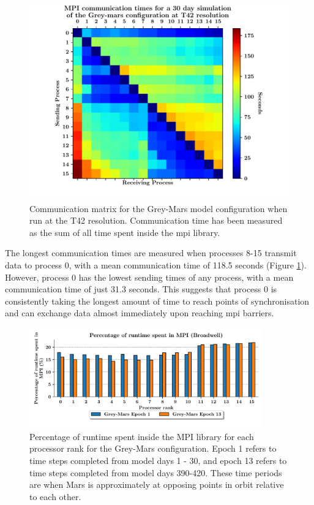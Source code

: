 \documentclass[a4paper,11pt]{report}
\begin{document}
\begin{figure}[htbp]
\begin{center}
\includegraphics[width=1\textwidth]{img/comm_mat_grey-mars.pdf}
\caption[Communication matrix for the Grey-Mars model configuration]{Communication matrix for the Grey-Mars model configuration when run at the T42 resolution. Communication time has been measured as the sum of all time spent inside the \gls{mpi} library.}
\label{fig:comm_mat}
\end{center}
\end{figure}
\par
The longest communication times are measured when processes 8-15 transmit data to process 0, with a mean communication time of 118.5 seconds (Figure \ref{fig:comm_mat}). However, process 0 has the lowest sending times of any process, with a mean communication time of just 31.3 seconds. This suggests that process 0 is consistently taking the longest amount of time to reach points of synchronisation and can exchange data almost immediately upon reaching \gls{mpi} barriers. 
\par
\begin{figure}[htbp]
\begin{center}
\includegraphics[width=0.9\textwidth]{img/mpi-barrier-time-grey-mars.pdf}
\caption{Percentage of runtime spent inside the MPI library for each processor rank for the Grey-Mars configuration. Epoch 1 refers to time steps completed from model days 1 - 30, and epoch 13 refers to time steps completed from model days 390-420. These time periods are when Mars is approximately at opposing points in orbit relative to each other.}
\label{fig:grey-mars-comms}
\end{center}
\end{figure}
\end{document}
